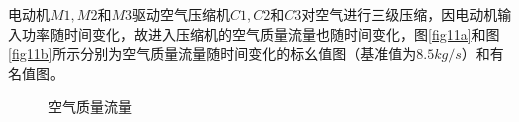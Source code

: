 \documentclass[journal,onecolumn]{IEEEtran}
\begin{document}
电动机$ M1,M2 $和$ M3 $驱动空气压缩机$ C1,C2 $和$ C3 $对空气进行三级压缩，因电动机输入功率随时间变化，故进入压缩机的空气质量流量也随时间变化，图\ref{fig11a}和图\ref{fig11b}所示分别为空气质量流量随时间变化的标幺值图（基准值为$ 8.5kg/s $）和有名值图。\\
\begin{figure}[ht]
	\caption{空气质量流量} %
	\label{fig:11}  %
\end{figure}
\end{document}
